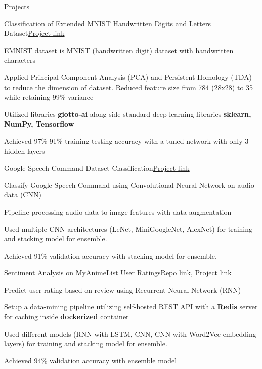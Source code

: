 \documentclass{resume} %
\begin{document}
\begin{rSection}{Projects}
    \begin{rSubsection}{Classification of Extended MNIST Handwritten Digits and Letters Dataset}{}{\href{https://colab.research.google.com/drive/18z161k3diYO6sNVBfiKH8uGqbrekxMPN?usp=sharing}{Project link}}{}
        \item EMNIST dataset is MNIST (handwritten digit) dataset with handwritten characters
        \item Applied Principal Component Analysis (PCA) and Persistent Homology (TDA) to reduce the dimension of dataset. Reduced feature size from 784 (28x28) to 35 while retaining 99\% variance
        \item Utilized libraries \textbf{giotto-ai} along-side standard deep learning libraries \textbf{sklearn, NumPy, Tensorflow}
        \item Achieved 97\%-91\% training-testing accuracy with a tuned network with only 3 hidden layers
    \end{rSubsection}

    \begin{rSubsection}{Google Speech Command Dataset Classification}{}{\href{https://colab.research.google.com/drive/1KCJjwgW6VDlANLmXYTotatk2xux3nw0N?usp=sharing}{Project link}}{}
        \item Classify Google Speech Command using Convolutional Neural Network on audio data (CNN)
        \item Pipeline processing audio data to image features with data augmentation
        \item Used multiple CNN architectures (LeNet, MiniGoogleNet, AlexNet) for training and stacking model for ensemble.
        \item Achieved 91\% validation accuracy with stacking model for ensemble.
    \end{rSubsection}

    \begin{rSubsection}{Sentiment Analysis on MyAnimeList User Ratings}{}{\href{https://github.com/n0k0m3/rnn-mal-sentiment}{Repo link}, \href{https://colab.research.google.com/github/n0k0m3/rnn-mal-sentiment/blob/main/main.ipynb}{Project link}}{}
        \item Predict user rating based on review using Recurrent Neural Network (RNN)
        \item Setup a data-mining pipeline utilizing self-hosted REST API with a \textbf{Redis} server for caching inside \textbf{dockerized} container
        \item Used different models (RNN with LSTM, CNN, CNN with Word2Vec embedding layers) for training and stacking model for ensemble.
        \item Achieved 94\% validation accuracy with ensemble model
    \end{rSubsection}


\end{rSection}
\end{document}
